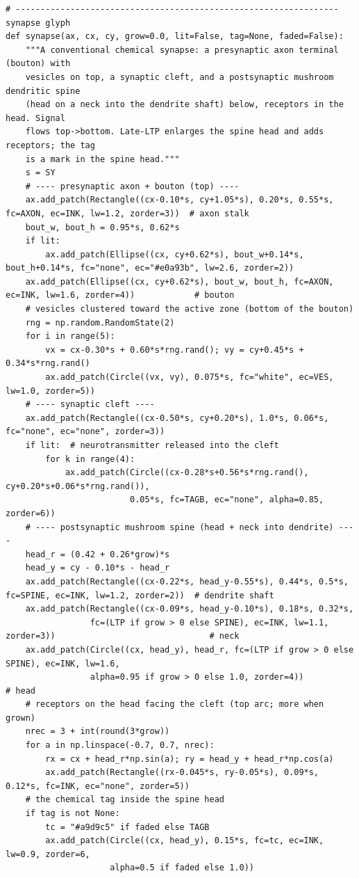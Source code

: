 \begin{lstlisting}[caption={schematics.ipynb code cell 5},label={lst:mrl-nb-schematics-5}]
# ----------------------------------------------------------------- synapse glyph
def synapse(ax, cx, cy, grow=0.0, lit=False, tag=None, faded=False):
    """A conventional chemical synapse: a presynaptic axon terminal (bouton) with
    vesicles on top, a synaptic cleft, and a postsynaptic mushroom dendritic spine
    (head on a neck into the dendrite shaft) below, receptors in the head. Signal
    flows top->bottom. Late-LTP enlarges the spine head and adds receptors; the tag
    is a mark in the spine head."""
    s = SY
    # ---- presynaptic axon + bouton (top) ----
    ax.add_patch(Rectangle((cx-0.10*s, cy+1.05*s), 0.20*s, 0.55*s, fc=AXON, ec=INK, lw=1.2, zorder=3))  # axon stalk
    bout_w, bout_h = 0.95*s, 0.62*s
    if lit:
        ax.add_patch(Ellipse((cx, cy+0.62*s), bout_w+0.14*s, bout_h+0.14*s, fc="none", ec="#e0a93b", lw=2.6, zorder=2))
    ax.add_patch(Ellipse((cx, cy+0.62*s), bout_w, bout_h, fc=AXON, ec=INK, lw=1.6, zorder=4))            # bouton
    # vesicles clustered toward the active zone (bottom of the bouton)
    rng = np.random.RandomState(2)
    for i in range(5):
        vx = cx-0.30*s + 0.60*s*rng.rand(); vy = cy+0.45*s + 0.34*s*rng.rand()
        ax.add_patch(Circle((vx, vy), 0.075*s, fc="white", ec=VES, lw=1.0, zorder=5))
    # ---- synaptic cleft ----
    ax.add_patch(Rectangle((cx-0.50*s, cy+0.20*s), 1.0*s, 0.06*s, fc="none", ec="none", zorder=3))
    if lit:  # neurotransmitter released into the cleft
        for k in range(4):
            ax.add_patch(Circle((cx-0.28*s+0.56*s*rng.rand(), cy+0.20*s+0.06*s*rng.rand()),
                         0.05*s, fc=TAGB, ec="none", alpha=0.85, zorder=6))
    # ---- postsynaptic mushroom spine (head + neck into dendrite) ----
    head_r = (0.42 + 0.26*grow)*s
    head_y = cy - 0.10*s - head_r
    ax.add_patch(Rectangle((cx-0.22*s, head_y-0.55*s), 0.44*s, 0.5*s, fc=SPINE, ec=INK, lw=1.2, zorder=2))  # dendrite shaft
    ax.add_patch(Rectangle((cx-0.09*s, head_y-0.10*s), 0.18*s, 0.32*s,
                 fc=(LTP if grow > 0 else SPINE), ec=INK, lw=1.1, zorder=3))                               # neck
    ax.add_patch(Circle((cx, head_y), head_r, fc=(LTP if grow > 0 else SPINE), ec=INK, lw=1.6,
                 alpha=0.95 if grow > 0 else 1.0, zorder=4))                                               # head
    # receptors on the head facing the cleft (top arc; more when grown)
    nrec = 3 + int(round(3*grow))
    for a in np.linspace(-0.7, 0.7, nrec):
        rx = cx + head_r*np.sin(a); ry = head_y + head_r*np.cos(a)
        ax.add_patch(Rectangle((rx-0.045*s, ry-0.05*s), 0.09*s, 0.12*s, fc=INK, ec="none", zorder=5))
    # the chemical tag inside the spine head
    if tag is not None:
        tc = "#a9d9c5" if faded else TAGB
        ax.add_patch(Circle((cx, head_y), 0.15*s, fc=tc, ec=INK, lw=0.9, zorder=6,
                     alpha=0.5 if faded else 1.0))


\end{lstlisting}
